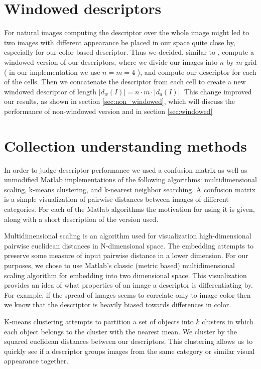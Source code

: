 \documentclass{report}
\begin{document}
\section{Windowed descriptors}

For natural images computing the descriptor over the whole image might led to two images with different appearance be placed in our space quite close by, especially for our color based descriptor. Thus we decided, similar to \cite{gist_descriptor}, compute a windowed version of our descriptors, where we divide our images into $n$ by $m$ grid ( in our implementation we use $n = m = 4 $ ), and compute our descriptor for each of the cells. Then we concatenate the descriptor from each cell to create a new windowed descriptor of length $|d_w(I)| = n \cdot m \cdot |d_a(I)|$. This change improved our results, as shown in section \ref{sec:non_windowed}, which will discuss the performance of non-windowed version and in section \ref{sec:windowed} 

\section{Collection understanding methods}

In order to judge descriptor performance we used a confusion matrix as well as unmodified Matlab implementations of the following algorithms: multidimensional scaling, k-means clustering, and k-nearest neighbor searching. A confusion matrix is a simple visualization of pairwise distances between images of different categories. For each of the Matlab algorithms the motivation for using it is given, along with a short description of the version used. 

Multidimensional scaling is an algorithm used for visualization high-dimensional pairwise euclidean distances in N-dimensional space. The embedding attempts to preserve some measure of input pairwise distance in a lower dimension. For our purposes, we chose to use Matlab's classic (metric based) multidimensional scaling algorithm for embedding into two dimensional space. This visualization provides an idea of what properties of an image a descriptor is differentiating by. For example, if the spread of images seems to correlate only to image color then we know that the descriptor is heavily biased towards differences in color.

K-means clustering attempts to partition a set of objects into $k$ clusters in which each object belongs to the cluster with the nearest mean. We cluster by the squared euclidean distances between our descriptors. This clustering allows us to quickly see if a descriptor groups images from the same category or similar visual appearance together.
\end{document}
